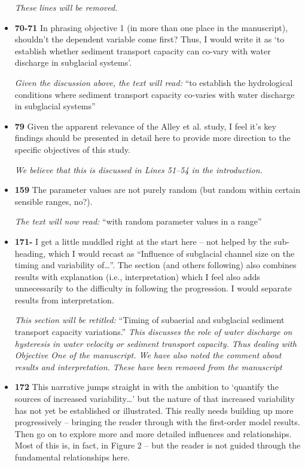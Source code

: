 \documentclass[11pt]{article}
\begin{document}
\begin{itemize}
  \textit{These lines will be removed.}

\item \textbf{70-71} In phrasing objective 1 (in more than one place in the manuscript),
  shouldn’t the dependent variable come first? Thus, I would write it as ‘to
  establish whether sediment transport capacity can co-vary with water
  discharge in subglacial systems’.

  \textit{Given the discussion above, the text will read:} ``to establish the hydrological conditions where  sediment transport capacity co-varies with water discharge in subglacial systems''
  
\item \textbf{79} Given the apparent relevance of the Alley et al. study, I feel it’s key findings
  should be presented in detail here to provide more direction to the specific
  objectives of this study.

  \textit{We believe that this is discussed in Lines 51--54 in the introduction.}


  
\item \textbf{159} The parameter values are not purely random (but random within certain
  sensible ranges, no?).

  \textit{The text will now  read:} ``with random parameter values in a range''

\item \textbf{171-} I get a little muddled right at the start here – not helped by the sub-heading,
  which I would recast as “Influence of subglacial channel size on the timing
  and variability of…”. The section (and others following) also combines
  results with explanation (i.e., interpretation) which I feel also adds
  unnecessarily to the difficulty in following the progression. I would separate
  results from interpretation.

  \textit{This section will be retitled:} ``Timing of subaerial and subglacial sediment transport capacity variations.''
  \textit{This discusses the role of water discharge on hysteresis in water velocity or sediment transport capacity. Thus dealing with Objective One of the manuscript. We have also noted the comment about results and interpretation. These have been removed from the manuscript}
  

\item \textbf{172} This narrative jumps straight in with the ambition to ‘quantify the sources
  of increased variability…’ but the nature of that increased variability has not
  yet be established or illustrated. This really needs building up more
  progressively – bringing the reader through with the first-order model
  results. Then go on to explore more and more detailed influences and
  relationships. Most of this is, in fact, in Figure 2 – but the reader is not
  guided through the fundamental relationships here.


\end{itemize}
\end{document}
